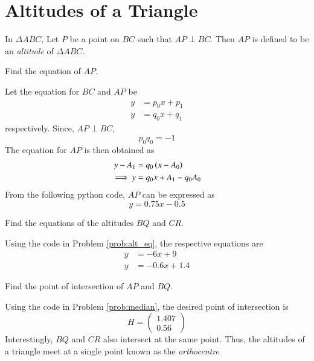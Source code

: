 \documentclass[journal,12pt,twocolumn]{IEEEtran}
\begin{document}
\section{Altitudes of a Triangle}
\begin{definition}
In $\Delta ABC$,  Let $P$ be a point on $BC$ such that $AP \perp BC$.  Then $AP$ is defined to be 
an {\em altitude} of $\Delta ABC$.
\end{definition}
\begin{problem}
\label{prob:alt_eq}
Find the equation of $AP$.
\end{problem}
\solution
Let the equation for $BC$ and $AP$ be
\begin{align}
y & = p_0x + p_1
\\
y & = q_0x + q_1
\end{align}
%
respectively. Since, $AP \perp BC$,
\begin{equation}
p_0q_0 = -1
\end{equation}
%
The equation for $AP$ is then obtained as
%
\begin{align}
y - A_1 &= q_0\left(x - A_0\right)
\\
\implies y &= q_0 x + A_1 - q_0 A_0
\end{align}
%
From the following python code, $AP$ can be expressed as
%
\begin{equation}
y = 0.75x - 0.5
\end{equation}
%

%
\begin{problem}
Find the equations of the altitudes $BQ$ and $CR$. 
\end{problem}
\solution 
Using the code in Problem \ref{prob:alt_eq}, the respective equations are
\begin{align}
y &= -6x + 9
\\
y &= -0.6x + 1.4
\end{align}
%
\begin{problem}
Find the point of intersection of $AP$ and $BQ$.
\end{problem}
\solution Using the code in Problem \ref{prob:median}, the desired point of intersection is
%
\begin{equation}
H = 
\begin{pmatrix}
 1.407
 \\
 0.56
\end{pmatrix}
\end{equation}
%
Interestingly, $BQ$ and $CR$ also intersect at the same point.  Thus, the altitudes of a triangle
meet at a single point known as the {\em orthocentre}
\end{document}
